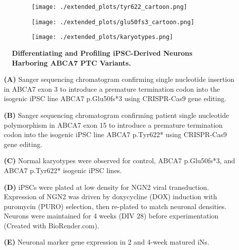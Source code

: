 \begin{figure}[H]
    \begin{subfigure}[t]{0.4\textwidth}
        \caption{}
        \hspace{1.5cm}
        \texttt{[image: ./extended\_plots/tyr622\_cartoon.png]}        
    \end{subfigure}  
    \hspace{1.5cm}
    \begin{subfigure}[t]{0.4\textwidth}
        \caption{}
        \texttt{[image: ./extended\_plots/glu50fs3\_cartoon.png]}        
    \end{subfigure}  
    \par
    \begin{subfigure}[t]{0.9\textwidth}
        \caption{}
        \hspace{1.5cm}
        \texttt{[image: ./extended\_plots/karyotypes.png]}        
    \end{subfigure}  
    \caption{
        \textbf{Differentiating and Profiling iPSC-Derived Neurons Harboring ABCA7 PTC Variants.}\\
    }
    \label{fig:ipsc_lines}
\end{figure}
\begin{itemize}
    \item[\textbf{(A)}] Sanger sequencing chromatogram confirming single nucleotide insertion in ABCA7 exon 3 to introduce a premature termination codon into the isogenic iPSC line ABCA7 p.Glu50fs*3 using CRISPR-Cas9 gene editing. 
    \item[\textbf{(B)}] Sanger sequencing chromatogram confirming patient single nucleotide polymorphism in ABCA7 exon 15 to introduce a premature termination codon into the isogenic iPSC line ABCA7 p.Tyr622* using CRISPR-Cas9 gene editing. 
    \item[\textbf{(C)}] Normal karyotypes were observed for control, ABCA7 p.Glu50fs*3, and ABCA7 p.Tyr622* isogenic iPSC lines. 
    \item[\textbf{(D)}] iPSCs were plated at low density for NGN2 viral transduction. Expression of NGN2 was driven by doxycycline (DOX) induction with puromycin (PURO) selection, then re-plated to match neuronal densities. Neurons were maintained for 4 weeks (DIV 28) before experimentation (Created with BioRender.com). 
    \item[\textbf{(E)}] Neuronal marker gene expression in 2 and 4-week matured iNs. 
\end{itemize}
